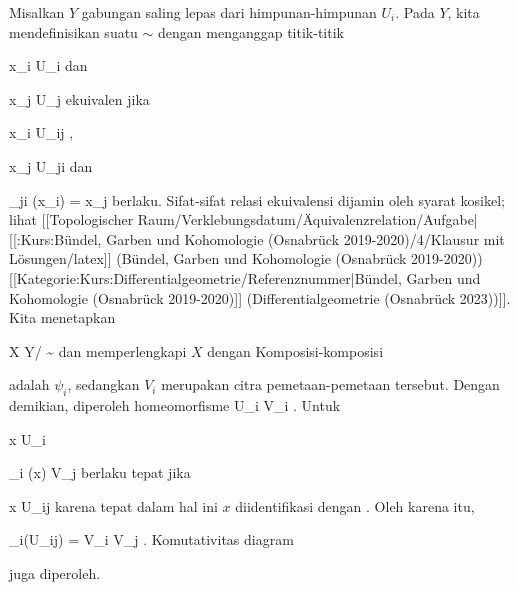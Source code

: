 {

Misalkan $Y$ gabungan saling lepas dari himpunan-himpunan $U_i$. Pada $Y$, kita mendefinisikan suatu
$\sim$ dengan menganggap titik-titik

\mavergleichskette
{\vergleichskette
{ x_i
}
{ \in }{ U_i
}
{  }{
}
{    }{
}
{   }{
}
}
{}{}{}
dan

\mavergleichskette
{\vergleichskette
{ x_j
}
{ \in }{ U_j
}
{  }{
}
{    }{
}
{   }{
}
}
{}{}{}
ekuivalen jika

\mavergleichskette
{\vergleichskette
{ x_i
}
{ \in }{ U_{ij}
}
{  }{
}
{    }{
}
{   }{
}
}
{}{}{,}

\mavergleichskette
{\vergleichskette
{ x_j
}
{ \in }{ U_{ji}
}
{  }{
}
{    }{
}
{   }{
}
}
{}{}{}
dan

\mavergleichskette
{\vergleichskette
{ \varphi_{ji} (x_i)
}
{ = }{ x_j
}
{  }{
}
{    }{
}
{   }{
}
}
{}{}{}
berlaku. Sifat-sifat relasi ekuivalensi dijamin oleh syarat kosikel; lihat
[[Topologischer Raum/Verklebungsdatum/Äquivalenzrelation/Aufgabe|[[:Kurs:Bündel, Garben und Kohomologie (Osnabrück 2019-2020)/4/Klausur mit Lösungen/latex]] (Bündel, Garben und Kohomologie (Osnabrück 2019-2020))[[Kategorie:Kurs:Differentialgeometrie/Referenznummer|Bündel, Garben und Kohomologie (Osnabrück 2019-2020)]] (Differentialgeometrie (Osnabrück 2023))]].
Kita menetapkan

\mavergleichskettedisp
{\vergleichskette
{X
}
{ } { Y/ \sim
}
{ } {
}
{ } {
}
{ } {
}
}
{}{}{}
dan memperlengkapi $X$ dengan
Komposisi-komposisi

 {  }

adalah $\psi_i$, sedangkan $V_i$ merupakan citra pemetaan-pemetaan tersebut. Dengan demikian, diperoleh homeomorfisme
 {U_i } { V_i
} {}
. Untuk

\mavergleichskette
{\vergleichskette
{ x
}
{ \in }{ U_i
}
{  }{
}
{    }{
}
{   }{
}
}
{}{}{}

\mavergleichskettedisp
{\vergleichskette
{ \psi_i (x)
}
{ \in} { V_j
}
{ } {
}
{ } {
}
{ } {
}
}
{}{}{}
berlaku tepat jika

\mavergleichskette
{\vergleichskette
{ x
}
{ \in }{ U_{ij}
}
{  }{
}
{    }{
}
{   }{
}
}
{}{}{}
karena tepat dalam hal ini $x$ diidentifikasi dengan
. Oleh karena itu,

\mavergleichskette
{\vergleichskette
{ \psi_i(U_{ij})
}
{ = }{ V_i \cap V_j
}
{  }{
}
{    }{
}
{   }{
}
}
{}{}{.}
Komutativitas diagram

 {  }

juga diperoleh.

 }

